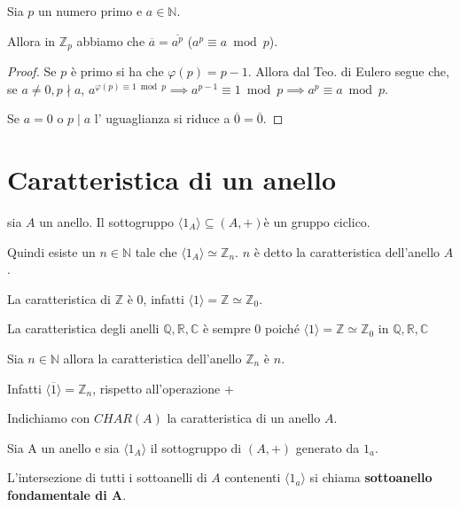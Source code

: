 \documentclass[../main.tex]{subfiles}
\begin{document}
\begin{corollary}
    Sia $p$ un numero primo e $a \in \mathbb{N}$.

    Allora in $\mathbb{Z}_p$ abbiamo che $\overline{a} = \overline{a^p}$ ($a^p \equiv a \bmod p$).
\end{corollary}
\begin{proof}
    Se $p$ è primo si ha che $\varphi(p) = p-1$. Allora dal Teo. di Eulero segue che, se $a \neq 0, p \nmid a$, $a^{\varphi(p) \equiv 1 \bmod p}\implies a ^{p-1} \equiv 1 \bmod p \implies a^p \equiv a \bmod p$.

    Se $a = 0$ o $p \mid a$ l' uguaglianza si riduce a $\overline{0} = \overline{0}$.
\end{proof}

\section{Caratteristica di un anello}
\begin{definition}
    sia $A$ un anello. Il sottogruppo $\langle1_A\rangle \subseteq (A,+)$è un gruppo ciclico.

    Quindi esiste un $n \in \mathbb{N}$ tale che $\langle1_A\rangle \simeq \mathbb{Z}_n$. $n$ è detto la caratteristica dell'anello $A$.
\end{definition}
\begin{example}
    La caratteristica di $\mathbb{Z}$ è 0, infatti $\langle1\rangle = \mathbb{Z} \simeq \mathbb{Z}_0$.

    La caratteristica degli anelli $\mathbb{Q},\mathbb{R},\mathbb{C}$ è sempre 0 poiché $\langle1\rangle = \mathbb{Z} \simeq \mathbb{Z}_0$ in $\mathbb{Q},\mathbb{R},\mathbb{C}$
\end{example}

\begin{example}
    Sia $n \in \mathbb{N}$ allora la caratteristica dell'anello $\mathbb{Z}_n$ è $n$.

    Infatti $\langle\overline{1}\rangle = \mathbb{Z}_n$, rispetto all'operazione +
\end{example}

Indichiamo con $CHAR(A)$ la caratteristica di un anello $A$.

\begin{definition}
    Sia A un anello e sia $\langle1_A\rangle$ il sottogruppo di $(A,+)$ generato da $1_a$.

    L'intersezione di tutti i sottoanelli di $A$ contenenti $\langle1_a\rangle$ si chiama \textbf{sottoanello fondamentale di A}.
\end{definition}
\end{document}
